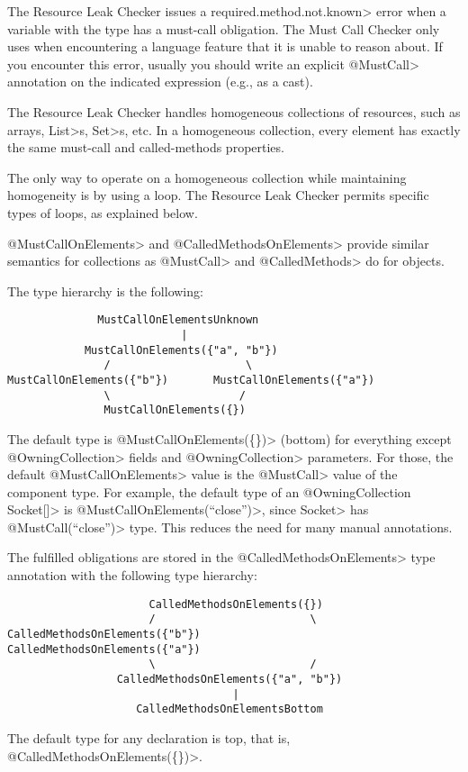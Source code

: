The Resource Leak Checker issues a \<required.method.not.known> error
when a variable with the type \MustCallUnknown has a must-call obligation.
The Must Call Checker
only uses \MustCallUnknown when encountering a language
feature that it is unable to reason about.
If you encounter this error, usually you should write an explicit \<@MustCall> annotation
on the indicated expression (e.g., as a cast).



The Resource Leak Checker handles homogeneous collections of resources,
such as arrays, \<List>s, \<Set>s, etc.  In a homogeneous collection, every element
has exactly the same must-call and called-methods properties.

The only way to operate on a homogeneous collection while maintaining
homogeneity is by using a loop.  The Resource Leak Checker permits
specific types of loops, as explained below.


\<@MustCallOnElements> and \<@CalledMethodsOnElements> provide similar semantics for collections as \<@MustCall> and \<@CalledMethods> do for objects.

The type hierarchy is the following:

\begin{verbatim}
              MustCallOnElementsUnknown
                           |
            MustCallOnElements({"a", "b"})
               /                     \
MustCallOnElements({"b"})       MustCallOnElements({"a"})
               \                    /
               MustCallOnElements({})
\end{verbatim}

The default type is \<@MustCallOnElements(\{\})> (bottom) for everything except
\<@OwningCollection> fields and \<@OwningCollection> parameters. For those, the
default \<@MustCallOnElements> value is the \<@MustCall> value of the component
type. For example, the default type of an \<@OwningCollection Socket[]> is
\<@MustCallOnElements({``close''})>, since \<Socket> has \<@MustCall(``close'')>
type. This reduces the need for many manual annotations.

The fulfilled obligations are stored in the \<@CalledMethodsOnElements> type annotation with the following type hierarchy:
\begin{verbatim}
                      CalledMethodsOnElements({})
                      /                        \
CalledMethodsOnElements({"b"})           CalledMethodsOnElements({"a"})
                      \                        /
                 CalledMethodsOnElements({"a", "b"})
                                   |
                    CalledMethodsOnElementsBottom
\end{verbatim}
The default type for any declaration is top, that is, \<@CalledMethodsOnElements(\{\})>.



